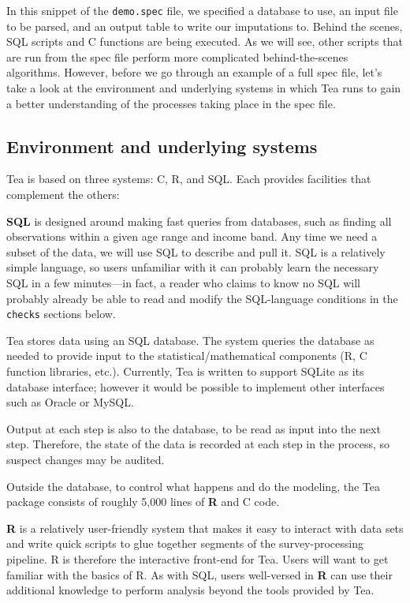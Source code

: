 \documentclass{article}
\begin{document}
In this snippet of the {\tt demo.spec} file, we specified a database to use, an input 
file to be parsed, and an output table to write our imputations to. Behind the scenes, 
SQL scripts and C functions are being executed. As we will see, other scripts that are 
run from the spec file perform more complicated behind-the-scenes algorithms. 
However, before we go through an example of a full spec file, let's take a look at 
the environment and underlying systems in which Tea runs to gain a better understanding 
of the processes taking place in the spec file.

\subsection{Environment and underlying systems}
Tea is based on three systems: C, R, and SQL. Each provides facilities that complement the others:

{\bf SQL} is designed around making fast queries from databases, such as finding all
observations within a given age range and income band. Any time we need a subset of the
data, we will use SQL to describe and pull it. SQL is a relatively simple language, so
users unfamiliar with it can probably learn the necessary SQL in a few
minutes---in fact, a reader who claims to know no SQL will probably already be able
to read and modify the SQL-language conditions in the {\tt checks} sections below.

Tea stores data using an SQL database. The system queries the database as
needed to provide input to the statistical/mathematical components (R, C function libraries, etc.).
Currently, Tea is written to support SQLite as its database interface; however it would
be possible to implement other interfaces such as Oracle or MySQL.

Output at each step is also to the database, to be read as input into the next
step. Therefore, the state of the data is recorded at each step in the process, so
suspect changes may be audited.

Outside the database, to control what happens and
do the modeling, the Tea package consists of roughly 5,000 lines of \textbf{R} and C code.

{\bf R} is a relatively user-friendly system that makes it easy to interact with data
sets and write quick scripts to glue together segments of the survey-processing pipeline.
R is therefore the interactive front-end for Tea. Users will want to get familiar with
the basics of R.  As with SQL, users well-versed in \textbf{R} can use their additional
knowledge to perform analysis beyond the tools provided by Tea.
\end{document}
